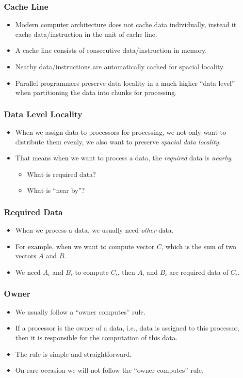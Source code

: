 \documentclass{beamer}
\begin{document}
\begin{CJK}{UTF8}{bsmi}
\begin{frame}
\frametitle{Cache Line}
\begin{itemize}
\item Modern computer architecture does not cache data individually,
  instead it cache data/instruction in the unit of cache line.
\item A cache line consists of consecutive data/instruction in memory.
\item Nearby data/instructions are automatically cached for spacial
  locality.
\item Parallel programmers preserve data locality in a much higher
  ``data level'' when partitioning the data into chunks for processing.
\end{itemize}
\end{frame}

\begin{frame}
\frametitle{Data Level Locality}
\begin{itemize}
\item When we assign data to processors for processing, we not only
  want to distribute them evenly, we also want to preserve {\em
    spacial data locality}.
\item That means when we want to process a data, the {\em required}
  data is {\em nearby}.
\begin{itemize}
\item What is required data?
\item What is ``near by''?
\end{itemize}
\end{itemize}
\end{frame}

\begin{frame}
\frametitle{Required Data}
\begin{itemize}
\item When we process a data, we usually need {\em other} data.
\item For example, when we want to compute vector $C$, which is the
  sum of two vectors $A$ and $B$.
\item We need $A_i$ and $B_i$ to compute $C_i$, then $A_i$ and $B_i$
  are required data of $C_i$.
\end{itemize}
\end{frame}

\begin{frame}
\frametitle{Owner}
\begin{itemize}
\item We usually follow a ``owner computes'' rule.
\item If a processor is the owner of a data, i.e., data is assigned to
  this processor, then it is responsible for the computation of this
  data.
\item The rule is simple and straightforward.
\item On rare occasion we will not follow the ``owner computes''
  rule.
\end{itemize}
\end{frame}


\end{CJK}
\end{document}
